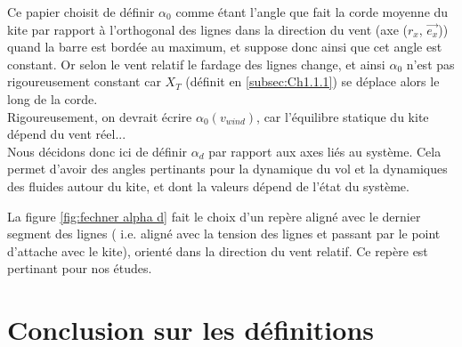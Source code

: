 Ce papier choisit de définir $\alpha_0$ comme étant l'angle que fait la corde moyenne du kite par rapport à l'orthogonal des lignes dans la direction du vent (axe ($r_x$, $\overrightarrow{e_x}$)) quand la barre est bordée au maximum, et suppose donc ainsi que cet angle est constant. Or selon le vent relatif le fardage des lignes change, et ainsi $\alpha_0$ n'est pas rigoureusement constant car $X_T$ (définit en \ref{subsec:Ch1.1.1}) se déplace alors le long de la corde.\\

Rigoureusement, on devrait écrire $\alpha_0(v_{wind})$, car l'équilibre statique du kite dépend du vent réel...\\

Nous décidons donc ici de définir $\alpha_d$ par rapport aux axes liés au système. Cela permet d'avoir des angles pertinants pour la dynamique du vol et la dynamiques des fluides autour du kite, et dont la valeurs dépend de l'état du système. 

La figure \ref{fig:fechner alpha d} fait le choix d'un repère aligné avec le dernier segment des lignes ( i.e. aligné avec la tension des lignes et passant par le point d'attache avec le kite), orienté dans la direction du vent relatif. Ce repère est pertinant pour nos études. 

\section{Conclusion sur les définitions}
\label{sec:Ch1.4}

